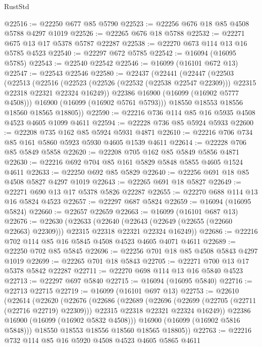 \begin{lexlean}{RustStd}
\begin{coremodule}
@22516 := @22250 @677 @85 @5790
@22523 := @22256 @676 @18 @85 @4508 @5788 @4297 @1019
@22526 := @22265 @676 @18 @5788
@22532 := @22271 @675 @13 @17 @5378 @5787 @22287
@22538 := @22270 @673 @114 @13 @16 @5785 @4523
@22540 := @22297 @672 @5785
@22542 := @16094 (@16095 @5785)
@22543 := @22540 @22542
@22546 := @16099 (@16101 @672 @13)
@22547 := @22543 @22546
@22580 := @22437
    (@22441
      (@22447
        (@22503
          (@22513
            (@22516
              (@22523 (@22526 (@22532 (@22538 @22547 @22309))) @22315 @22318 @22321 @22324 @16249))
            @22386
            @16900
            (@16099 (@16902 @5777 @4508)))
          @16900
          (@16099 (@16902 @5761 @5793)))
        @18550
        @18553
        @18556
        @18560
        @18565
        @18805))
@22590 := @22216 @736 @114 @85 @16 @5935 @4508 @4523 @4605 @1099 @4611
@22594 := @22228 @736 @85 @5924 @5933
@22600 := @22208 @735 @162 @85 @5924 @5931 @4871
@22610 := @22216 @706 @734 @85 @161 @5860 @5923 @5930 @4605 @1539 @4611
@22614 := @22228 @706 @85 @5849 @5858
@22620 := @22208 @705 @162 @85 @5849 @5856 @4871
@22630 := @22216 @692 @704 @85 @161 @5829 @5848 @5855 @4605 @1524 @4611
@22633 := @22250 @692 @85 @5829
@22640 := @22256 @691 @18 @85 @4508 @5827 @4297 @1019
@22643 := @22265 @691 @18 @5827
@22649 := @22271 @690 @13 @17 @5378 @5826 @22287
@22655 := @22270 @688 @114 @13 @16 @5824 @4523
@22657 := @22297 @687 @5824
@22659 := @16094 (@16095 @5824)
@22660 := @22657 @22659
@22663 := @16099 (@16101 @687 @13)
@22676 := @22630
    (@22633
      (@22640 (@22643 (@22649 (@22655 (@22660 @22663) @22309))) @22315 @22318 @22321 @22324 @16249))
@22686 := @22216 @702 @114 @85 @16 @5845 @4508 @4523 @4605 @4071 @4611
@22689 := @22250 @702 @85 @5845
@22696 := @22256 @701 @18 @85 @4508 @5843 @4297 @1019
@22699 := @22265 @701 @18 @5843
@22705 := @22271 @700 @13 @17 @5378 @5842 @22287
@22711 := @22270 @698 @114 @13 @16 @5840 @4523
@22713 := @22297 @697 @5840
@22715 := @16094 (@16095 @5840)
@22716 := @22713 @22715
@22719 := @16099 (@16101 @697 @13)
@22753 := @22610
    (@22614
      (@22620
        (@22676
          (@22686
            (@22689
              (@22696
                (@22699 (@22705 (@22711 (@22716 @22719) @22309)))
                @22315
                @22318
                @22321
                @22324
                @16249))
            @22386
            @16900
            (@16099 (@16902 @5832 @4508)))
          @16900
          (@16099 (@16902 @5816 @5848)))
        @18550
        @18553
        @18556
        @18560
        @18565
        @18805))
@22763 := @22216 @732 @114 @85 @16 @5920 @4508 @4523 @4605 @5865 @4611

\end{coremodule}
\end{lexlean}
